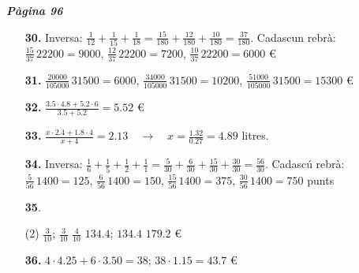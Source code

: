 \documentclass[a4paper, pdf, twoside]{book}
\begin{document}
\begin{multicols}{2}

{\textbf{\em Pàgina 96}} \hrulefill
\begin{enumerate}
\vspace{0.25cm}
\item[\fontfamily{phv}\selectfont\color{blue}\textbf{30. }] 
Inversa: $\frac {1}{12}+\frac {1}{15}+\frac {1}{18}=\frac {15}{180}+\frac {12}{180}+\frac {10}{180}=\frac {37}{180}$. Cadascun rebrà: $\frac {15}{37}\, 22200=9000$, $\frac {12}{37}\, 22200=7200$, $\frac {10}{37}\, 22200=6000$ \euro {}
 \end{enumerate}
\begin{enumerate}
\vspace{0.25cm}
\item[\fontfamily{phv}\selectfont\color{blue}\textbf{31. }] 
$\frac {20000}{105000} \,31500=6000$, $\frac {34000}{105000} \,31500=10200$, $\frac {51000}{105000} \,31500=15300$ \euro {}
\vspace{0.25cm}
\item[\fontfamily{phv}\selectfont\color{blue}\textbf{32. }] 
$\frac {3.5\cdot 4.8 + 5.2 \cdot 6}{3.5+5.2}=5.52$ \euro {} 
\vspace{0.25cm}
\item[\fontfamily{phv}\selectfont\color{blue}\textbf{33. }] 
$\frac {x\cdot 2.4 + 1.8 \cdot 4}{x+4}=2.13 \quad \rightarrow \quad x=\frac {1.32}{0.27}=4.89$ litres. 
\vspace{0.25cm}
\item[\fontfamily{phv}\selectfont\color{blue}\textbf{34. }] 
Inversa: $\frac {1}{6}+\frac {1}{5}+\frac {1}{2}+\frac {1}{1}=\frac {5}{30}+\frac {6}{30}+\frac {15}{30}+\frac {30}{30}=\frac {56}{30}$. Cadascú rebrà: $\frac {5}{56} \, 1400=125$, $\frac {6}{56} \, 1400=150$, $\frac {15}{56} \, 1400=375$, $\frac {30}{56} \, 1400=750$ punts
\vspace{0.25cm}



 \item[\fontfamily{phv}\selectfont\color{blue}\textbf{35}. ] 
 \begin{tasks}[column-sep=1em, item-indent=1.3333em](2)
	 \task* $\frac {3}{10}$; $\frac {3}{10}$
	 \task $\frac {4}{10}$
	 \task $134.4$; $134.4$
	 \task $179.2$ \euro {}
\end{tasks}
\vspace{0.25cm}
\item[\fontfamily{phv}\selectfont\color{blue}\textbf{36. }] 
$4\cdot 4.25+ 6\cdot 3.50 = 38$; $38\cdot 1.15=43.7$ \euro {}
 \end{enumerate}
\vspace{0.3cm}


\end{multicols}
\end{document}
